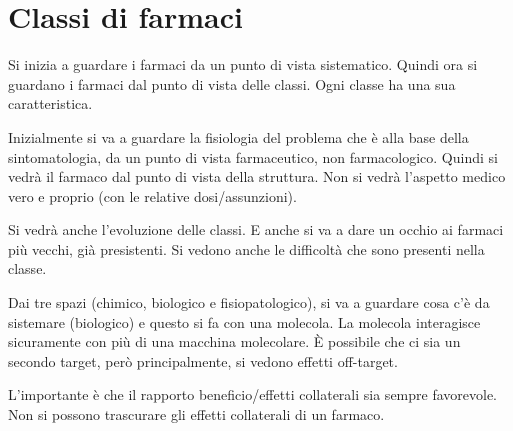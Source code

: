 \cleardoublepage{}
\begingroup

\def\newpage{}
\part{Classi di farmaci}

\pagebreak

\thispagestyle{empty}
\vspace*{\fill}
Si inizia a guardare i farmaci da un punto di vista sistematico. Quindi
ora si guardano i farmaci dal punto di vista delle classi.
Ogni classe ha una sua caratteristica.

Inizialmente si va a guardare la fisiologia del problema che è alla base della sintomatologia, da un punto di vista farmaceutico, non farmacologico.
Quindi si vedrà il farmaco dal punto di vista della struttura. Non si
vedrà l'aspetto medico vero e proprio (con le relative dosi/assunzioni).

Si vedrà anche l'evoluzione delle classi. E anche si va a dare un occhio
ai farmaci più vecchi, già presistenti.
Si vedono anche le difficoltà che sono presenti nella classe.

Dai tre spazi (chimico, biologico e fisiopatologico), si va a guardare
cosa c'è da sistemare (biologico) e questo si fa con una molecola.
La molecola interagisce sicuramente con più di una macchina molecolare.
È possibile che ci sia un secondo target, però principalmente, si vedono
effetti off-target.

L'importante è che il rapporto beneficio/effetti collaterali sia sempre
favorevole. Non si possono trascurare gli effetti collaterali di un
farmaco.
\vfill

\endgroup